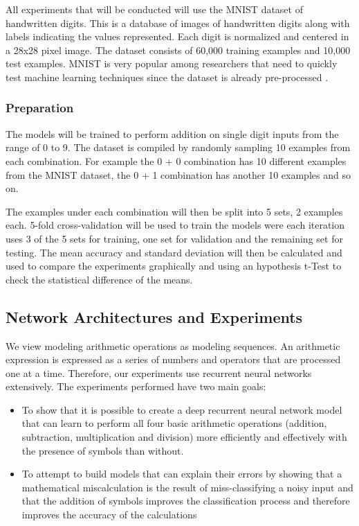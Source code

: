 \documentclass{article}
\begin{document}
	All experiments that will be conducted will use the MNIST dataset of handwritten digits. This is a database of images of handwritten digits along with labels indicating the values represented. Each digit is normalized and centered in a 28x28 pixel image. The dataset consists of 60,000 training examples and 10,000 test examples. MNIST is very popular among researchers that need to quickly test machine learning techniques since the dataset is already pre-processed \cite{MNIST}.
	
	\subsubsection{Preparation}
	
	The models will be trained to perform addition on single digit inputs from the range of 0 to 9. The dataset is compiled by randomly sampling 10 examples from each combination. For example the 0 + 0 combination has 10 different examples from the MNIST dataset, the 0 + 1 combination has another 10 examples and so on.
	
	The examples under each combination will then be split into 5 sets, 2 examples each. 5-fold cross-validation will be used to train the models were each iteration uses 3 of the 5 sets for training, one set for validation and the remaining set for testing. The mean accuracy and standard deviation will then be calculated and used to compare the experiments graphically and using an hypothesis t-Test to check the statistical difference of the means.
	
	\subsection{Network Architectures and Experiments}
	
	We view modeling arithmetic operations as modeling sequences. An arithmetic expression is expressed as a series of numbers and operators that are processed one at a time. Therefore, our experiments use recurrent neural networks extensively. The experiments performed have two main goals:
	\begin{itemize}
		\item To show that it is possible to create a deep recurrent neural network model that can learn to perform all four basic arithmetic operations (addition, subtraction, multiplication and division) more efficiently and effectively with the presence of symbols than without.
		\item To attempt to build models that can explain their errors by showing that a mathematical miscalculation is the result of miss-classifying a noisy input and that the addition of symbols improves the classification process and therefore improves the accuracy of the calculations
	\end{itemize}
	
\end{document}

